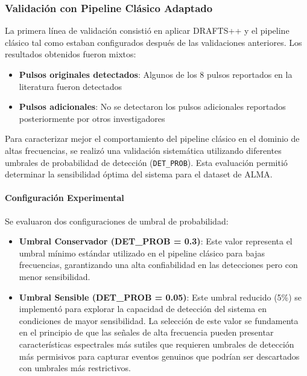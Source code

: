 \subsubsection{Validación con Pipeline Clásico Adaptado}

La primera línea de validación consistió en aplicar DRAFTS++ y el pipeline clásico tal como estaban configurados después de las validaciones anteriores. Los resultados obtenidos fueron mixtos:

\begin{itemize}
    \item \textbf{Pulsos originales detectados}: Algunos de los 8 pulsos reportados en la literatura fueron detectados
    \item \textbf{Pulsos adicionales}: No se detectaron los pulsos adicionales reportados posteriormente por otros investigadores
\end{itemize}

Para caracterizar mejor el comportamiento del pipeline clásico en el dominio de altas frecuencias, se realizó una validación sistemática utilizando diferentes umbrales de probabilidad de detección (\texttt{DET\_PROB}). Esta evaluación permitió determinar la sensibilidad óptima del sistema para el dataset de ALMA.

\paragraph{Configuración Experimental}

Se evaluaron dos configuraciones de umbral de probabilidad:

\begin{itemize}
    \item \textbf{Umbral Conservador (DET\_PROB = 0.3)}: Este valor representa el umbral mínimo estándar utilizado en el pipeline clásico para bajas frecuencias, garantizando una alta confiabilidad en las detecciones pero con menor sensibilidad.
    \item \textbf{Umbral Sensible (DET\_PROB = 0.05)}: Este umbral reducido (5\%) se implementó para explorar la capacidad de detección del sistema en condiciones de mayor sensibilidad. La selección de este valor se fundamenta en el principio de que las señales de alta frecuencia pueden presentar características espectrales más sutiles que requieren umbrales de detección más permisivos para capturar eventos genuinos que podrían ser descartados con umbrales más restrictivos.
\end{itemize}

